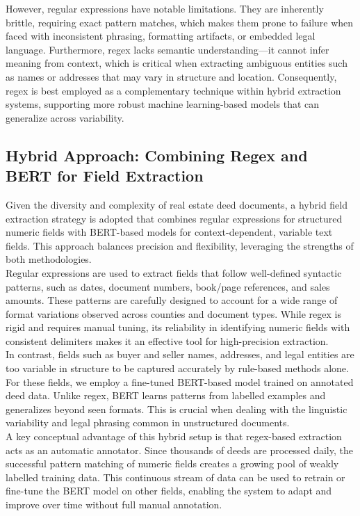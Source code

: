 \documentclass{article}
\begin{document}
However, regular expressions have notable limitations. They are inherently brittle, requiring exact pattern matches, which makes them prone to failure when faced with inconsistent phrasing, formatting artifacts, or embedded legal language. Furthermore, regex lacks semantic understanding—it cannot infer meaning from context, which is critical when extracting ambiguous entities such as names or addresses that may vary in structure and location. Consequently, regex is best employed as a complementary technique within hybrid extraction systems, supporting more robust machine learning-based models that can generalize across variability.

\subsection{Hybrid Approach: Combining Regex and BERT for Field Extraction}

Given the diversity and complexity of real estate deed documents, a hybrid field extraction strategy is adopted that combines regular expressions for structured numeric fields with BERT-based models for context-dependent, variable text fields. This approach balances precision and flexibility, leveraging the strengths of both methodologies. \\

Regular expressions are used to extract fields that follow well-defined syntactic patterns, such as dates, document numbers, book/page references, and sales amounts. These patterns are carefully designed to account for a wide range of format variations observed across counties and document types. While regex is rigid and requires manual tuning, its reliability in identifying numeric fields with consistent delimiters makes it an effective tool for high-precision extraction. \\

In contrast, fields such as buyer and seller names, addresses, and legal entities are too variable in structure to be captured accurately by rule-based methods alone. For these fields, we employ a fine-tuned BERT-based model trained on annotated deed data. Unlike regex, BERT learns patterns from labelled examples and generalizes beyond seen formats. This is crucial when dealing with the linguistic variability and legal phrasing common in unstructured documents. \\

A key conceptual advantage of this hybrid setup is that regex-based extraction acts as an automatic annotator. Since thousands of deeds are processed daily, the successful pattern matching of numeric fields creates a growing pool of weakly labelled training data. This continuous stream of data can be used to retrain or fine-tune the BERT model on other fields, enabling the system to adapt and improve over time without full manual annotation. \\
\end{document}
